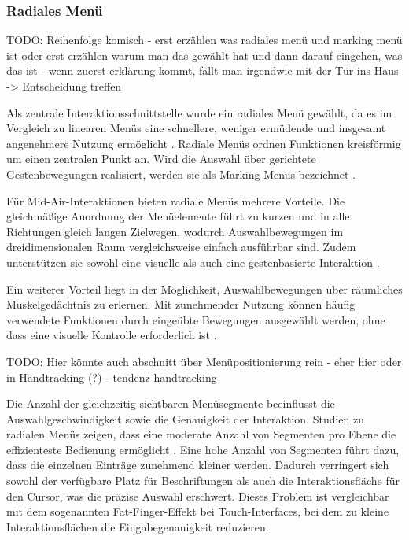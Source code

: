 \subsubsection{Radiales Menü}
{\color{red} TODO: Reihenfolge komisch - erst erzählen was radiales menü und marking menü ist oder erst erzählen warum man das gewählt hat und dann darauf eingehen, was das ist - wenn zuerst erklärung kommt, fällt man irgendwie mit der Tür ins Haus -> Entscheidung treffen}

Als zentrale Interaktionsschnittstelle wurde ein radiales Menü gewählt, da es im Vergleich zu linearen Menüs eine schnellere, weniger ermüdende und insgesamt angenehmere Nutzung ermöglicht \parencite{Mao2024comparisonOfPanelAndPieMenusForMidAirInteractionInPhotoBooth, callahan1988comparisonPieVsLinearMenus}. Radiale Menüs ordnen Funktionen kreisförmig um einen zentralen Punkt an. Wird die Auswahl über gerichtete Gestenbewegungen realisiert, werden sie als Marking Menus bezeichnet \parencite{kurtenbachbuxton1993markingmenus, kurtenbachPaul1993theDesignAndEvaluationOfMarkingMenus}.

Für Mid-Air-Interaktionen bieten radiale Menüs mehrere Vorteile. Die gleichmäßige Anordnung der Menüelemente führt zu kurzen und in alle Richtungen gleich langen Zielwegen, wodurch Auswahlbewegungen im dreidimensionalen Raum vergleichsweise einfach ausführbar sind. Zudem unterstützen sie sowohl eine visuelle als auch eine gestenbasierte Interaktion \parencite{kurtenbachbuxton1993markingmenus, kurtenbachPaul1993theDesignAndEvaluationOfMarkingMenus}.

Ein weiterer Vorteil liegt in der Möglichkeit, Auswahlbewegungen über räumliches Muskelgedächtnis zu erlernen. Mit zunehmender Nutzung können häufig verwendete Funktionen durch eingeübte Bewegungen ausgewählt werden, ohne dass eine visuelle Kontrolle erforderlich ist \parencite{kurtenbachbuxton1993markingmenus}.

{\color{red} TODO: Hier könnte auch abschnitt über Menüpositionierung rein - eher hier oder in Handtracking (?) - tendenz handtracking}

Die Anzahl der gleichzeitig sichtbaren Menüsegmente beeinflusst die Auswahlgeschwindigkeit sowie die Genauigkeit der Interaktion. Studien zu radialen Menüs zeigen, dass eine moderate Anzahl von Segmenten pro Ebene die effizienteste Bedienung ermöglicht \parencite{li2021depthandbreadthofpiemenusformidairgesdtureinteraction}.
Eine hohe Anzahl von Segmenten führt dazu, dass die einzelnen Einträge zunehmend kleiner werden. Dadurch verringert sich sowohl der verfügbare Platz für Beschriftungen als auch die Interaktionsfläche für den Cursor, was die präzise Auswahl erschwert. Dieses Problem ist vergleichbar mit dem sogenannten Fat-Finger-Effekt bei Touch-Interfaces, bei dem zu kleine Interaktionsflächen die Eingabegenauigkeit reduzieren.

